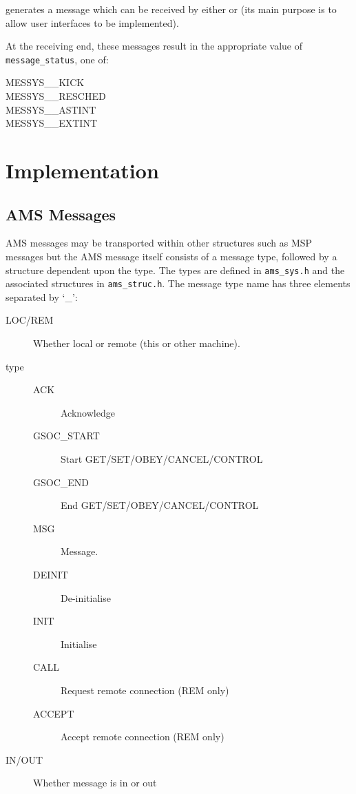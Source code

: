\documentclass[twoside,11pt,nolof]{starlink}
\begin{document}
generates a message which can be received by either
or
(its main purpose is to allow user interfaces to be implemented).

At the receiving end, these messages result in the appropriate value of
\texttt{message\_status}, one of:
\begin{description}
\item[MESSYS\_\_KICK]
\item[MESSYS\_\_RESCHED]
\item[MESSYS\_\_ASTINT]
\item[MESSYS\_\_EXTINT]
\end{description}
\section{Implementation}

\subsection{AMS Messages}
AMS messages may be transported within other structures such as MSP messages
but the AMS message itself consists of a message type, followed by a structure
dependent upon the type. The types are defined in \texttt{ams\_sys.h} and
the associated structures in \texttt{ams\_struc.h}.
The message type name has three elements separated by `\_':
\begin{description}
\item[LOC/REM] Whether local or remote (this or other machine).
\item[type]
 \begin{description}
 \item[ACK]     Acknowledge
 \item[GSOC\_START]  Start  GET/SET/OBEY/CANCEL/CONTROL
 \item[GSOC\_END]    End GET/SET/OBEY/CANCEL/CONTROL
 \item[MSG]     Message.
 \item[DEINIT]  De-initialise
 \item[INIT]    Initialise
 \item[CALL]    Request remote connection (REM only)
 \item[ACCEPT]  Accept remote connection (REM only)
\end{description}
\item[IN/OUT] Whether message is in or out
\end{description}
\end{document}

